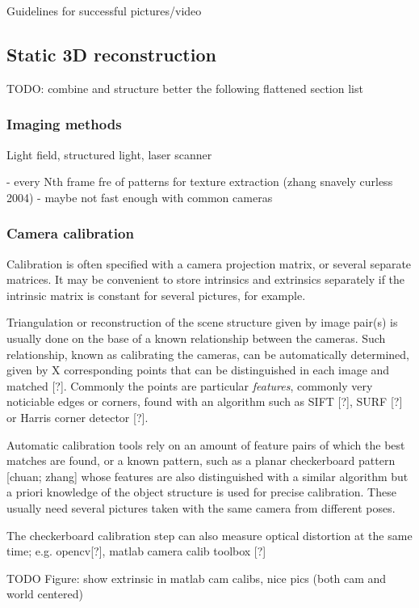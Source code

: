 Guidelines for successful pictures/video

\subsection{Static 3D reconstruction}

TODO: combine and structure better the following flattened section list

\subsubsection{Imaging methods}

Light field, structured light, laser scanner

- every Nth frame fre of patterns for texture extraction (zhang snavely curless 2004)
- maybe not fast enough with common cameras

\subsubsection{Camera calibration}

Calibration is often specified with a camera projection matrix, or several separate matrices. It may be convenient to store intrinsics and extrinsics separately if the intrinsic matrix is constant for several pictures, for example.

Triangulation or reconstruction of the scene structure given by image pair(s) is usually done on the base of a known relationship between the cameras. Such relationship, known as calibrating the cameras, can be automatically determined, given by X corresponding points that can be distinguished in each image and matched [?]. Commonly the points are particular \emph{features}, commonly very noticiable edges or corners, found with an algorithm such as SIFT [?], SURF [?] or Harris corner detector [?].

Automatic calibration tools rely on an amount of feature pairs of which the best matches are found, or a known pattern, such as a planar checkerboard pattern [chuan; zhang] whose features are also distinguished with a similar algorithm but a priori knowledge of the object structure is used for precise calibration. These usually need several pictures taken with the same camera from different poses.

The checkerboard calibration step can also measure optical distortion at the same time; e.g. opencv[?], matlab camera calib toolbox [?]

TODO Figure: show extrinsic in matlab cam calibs, nice pics (both cam and world centered)

